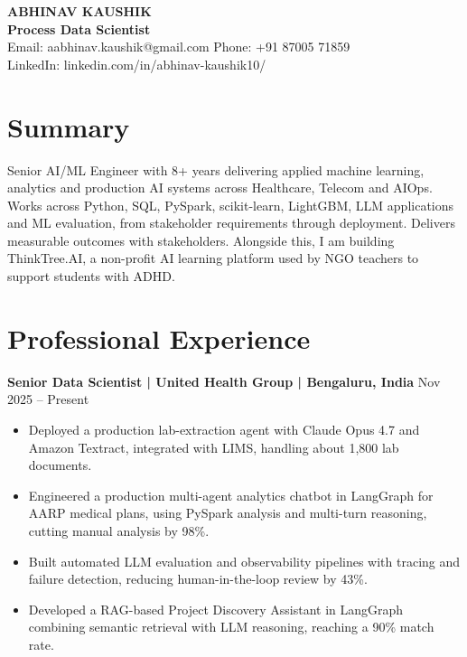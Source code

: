 \documentclass[10pt,a4paper]{article}
\newcommand{\role}[2]{\textbf{#1} \hfill #2\par}
\begin{document}
\begin{center}
  {\Large\bfseries ABHINAV KAUSHIK}\\[1pt]
  \textbf{Process Data Scientist}\\[1pt]
  Email: aabhinav.kaushik@gmail.com \quad Phone: +91 87005 71859\\
  LinkedIn: linkedin.com/in/abhinav-kaushik10/
\end{center}

\section{Summary}
Senior AI/ML Engineer with 8+ years delivering applied machine learning, analytics and production AI systems across Healthcare, Telecom and AIOps. Works across Python, SQL, PySpark, scikit-learn, LightGBM, LLM applications and ML evaluation, from stakeholder requirements through deployment. Delivers measurable outcomes with stakeholders. Alongside this, I am building ThinkTree.AI, a non-profit AI learning platform used by NGO teachers to support students with ADHD.

\section{Professional Experience}
\role{Senior Data Scientist | United Health Group | Bengaluru, India}{Nov 2025 -- Present}
\begin{itemize}
  \item Deployed a production lab-extraction agent with Claude Opus 4.7 and Amazon Textract, integrated with LIMS, handling about 1,800 lab documents.
  \item Engineered a production multi-agent analytics chatbot in LangGraph for AARP medical plans, using PySpark analysis and multi-turn reasoning, cutting manual analysis by 98\%.
  \item Built automated LLM evaluation and observability pipelines with tracing and failure detection, reducing human-in-the-loop review by 43\%.
  \item Developed a RAG-based Project Discovery Assistant in LangGraph combining semantic retrieval with LLM reasoning, reaching a 90\% match rate.
\end{itemize}
\vspace{3pt}
\end{document}

